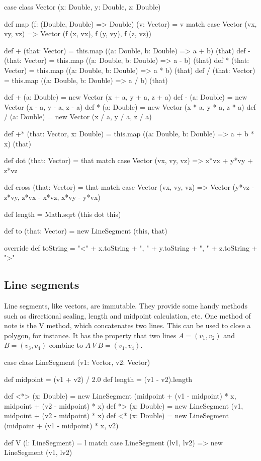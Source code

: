 \documentclass{article}
\begin{document}
      \begin{scalacode}
case class Vector (x: Double, y: Double, z: Double) {
  def map (f: (Double, Double) => Double) (v: Vector) = v match {
    case Vector (vx, vy, vz) => Vector (f (x, vx), f (y, vy), f (z, vz))}

  def + (that: Vector) = this.map ((a: Double, b: Double) => a + b) (that)
  def - (that: Vector) = this.map ((a: Double, b: Double) => a - b) (that)
  def * (that: Vector) = this.map ((a: Double, b: Double) => a * b) (that)
  def / (that: Vector) = this.map ((a: Double, b: Double) => a / b) (that)

  def + (a: Double) = new Vector (x + a, y + a, z + a)
  def - (a: Double) = new Vector (x - a, y - a, z - a)
  def * (a: Double) = new Vector (x * a, y * a, z * a)
  def / (a: Double) = new Vector (x / a, y / a, z / a)

  def +* (that: Vector, x: Double) = this.map ((a: Double, b: Double) => a + b * x) (that)

  def dot (that: Vector) = that match {
    case Vector (vx, vy, vz) => x*vx + y*vy + z*vz}

  def cross (that: Vector) = that match {
    case Vector (vx, vy, vz) => Vector (y*vz - z*vy, z*vx - x*vz, x*vy - y*vx)}

  def length = Math.sqrt (this dot this)

  def to (that: Vector) = new LineSegment (this, that)

  override def toString = "<" + x.toString + ", " + y.toString + ", " + z.toString + ">"
}
      \end{scalacode}

    \subsection{Line segments}
      \label{sec:line-segments}

      Line segments, like vectors, are immutable. They provide some handy methods such as directional scaling, length and midpoint calculation, etc. One method
      of note is the V method, which concatenates two lines. This can be used to close a polygon, for instance. It has the property that two lines $A = (v_1,
      v_2)$ and $B = (v_3, v_4)$ combine to $A~V~B = (v_1, v_4)$.

      \begin{scalacode}
case class LineSegment (v1: Vector, v2: Vector) {
  def midpoint = (v1 + v2) / 2.0
  def length   = (v1 - v2).length

  def <*> (x: Double) = new LineSegment (midpoint + (v1 - midpoint) * x, midpoint + (v2 - midpoint) * x)
  def  *> (x: Double) = new LineSegment (v1, midpoint + (v2 - midpoint) * x)
  def <*  (x: Double) = new LineSegment (midpoint + (v1 - midpoint) * x, v2)

  def V (l: LineSegment) = l match {
    case LineSegment (lv1, lv2) => new LineSegment (v1, lv2)}
}
      \end{scalacode}
\end{document}
